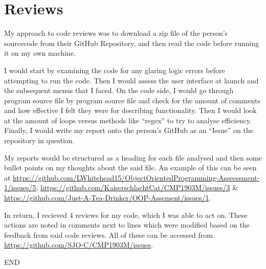 \documentclass[11pt]{article} %
\begin{document}
\section{Reviews}
My approach to code reviews was to download a zip file of the person's sourcecode from their GitHub Repository, and then read the code before running it on my own machine.\par
I would start by examining the code for any glaring logic errors before attempting to run the code. Then I would assess the user interface at launch and the subsequent menus that I faced. On the code side, I would go through program source file by program source file and check for the amount of comments and how effective I felt they were for describing functionality. Then I would look at the amount of loops versus methods like ``regex'' to try to analyse efficiency. Finally, I would write my report onto the person's GitHub as an ``Issue'' on the repository in question.\par
My reports would be structured as a heading for each file analysed and then some bullet points on my thoughts about the said file. An example of this can be seen at \url{https://github.com/LWhitehead15/ObjectOrientedProgramming-Asseessment-1/issues/5}, \url{https://github.com/KaiserschlachtCat/CMP1903M/issues/3} \& \url{https://github.com/Just-A-Tea-Drinker/OOP-Assement/issues/1}.\par
In return, I recieved 4 reviews for my code, which I was able to act on. These actions are noted in comments next to lines which were modified based on the feedback from said code reviews. All of these can be accessed from \url{https://github.com/SJO-C/CMP1903M/issues}.\\
\vfill
\begin{centering}\huge{END}\end{centering}
\end{document}
